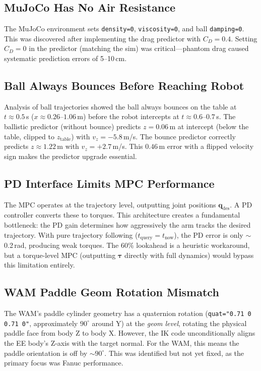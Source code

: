 \documentclass[11pt,letterpaper]{article}
\newcommand{\vv}[1]{\mathbf{#1}}
\begin{document}
\subsection{MuJoCo Has No Air Resistance}

The MuJoCo environment sets \texttt{density=0}, \texttt{viscosity=0}, and ball \texttt{damping=0}.  This was discovered after implementing the drag predictor with $C_D = 0.4$.  Setting $C_D = 0$ in the predictor (matching the sim) was critical---phantom drag caused systematic prediction errors of 5--10\,cm.

\subsection{Ball Always Bounces Before Reaching Robot}

Analysis of ball trajectories showed the ball always bounces on the table at $t \approx 0.5$\,s ($x \approx 0.26$--$1.06$\,m) before the robot intercepts at $t \approx 0.6$--$0.7$\,s.  The ballistic predictor (without bounce) predicts $z = 0.06$\,m at intercept (below the table, clipped to $z_{\text{table}}$) with $v_z = -5.8$\,m/s.  The bounce predictor correctly predicts $z \approx 1.22$\,m with $v_z = +2.7$\,m/s.  This $0.46$\,m error with a flipped velocity sign makes the predictor upgrade essential.

\subsection{PD Interface Limits MPC Performance}

The MPC operates at the trajectory level, outputting joint positions $\vv{q}_{\text{des}}$.  A PD controller converts these to torques.  This architecture creates a fundamental bottleneck: the PD gain determines how aggressively the arm tracks the desired trajectory.  With pure trajectory following ($t_{\text{query}} = t_{\text{now}}$), the PD error is only $\sim$0.2\,rad, producing weak torques.  The 60\% lookahead is a heuristic workaround, but a torque-level MPC (outputting $\boldsymbol{\tau}$ directly with full dynamics) would bypass this limitation entirely.

\subsection{WAM Paddle Geom Rotation Mismatch}

The WAM's paddle cylinder geometry has a quaternion rotation (\texttt{quat="0.71 0 0.71 0"}, approximately $90^{\circ}$ around Y) at the \emph{geom level}, rotating the physical paddle face from body Z to body X.  However, the IK code unconditionally aligns the EE body's Z-axis with the target normal.  For the WAM, this means the paddle orientation is off by $\sim$$90^{\circ}$.  This was identified but not yet fixed, as the primary focus was Fanuc performance.
\end{document}
